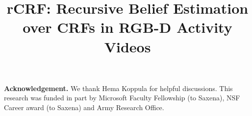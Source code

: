 \documentclass[conference]{IEEEtran}
\begin{document}
\title{rCRF: Recursive Belief Estimation over CRFs in RGB-D Activity Videos}

\author{
\and
{}
}



\maketitle



\IEEEpeerreviewmaketitle





%







\vspace{5mm}

\noindent\textbf{Acknowledgement.} We thank Hema Koppula for helpful discussions. This research was funded in part by Microsoft
Faculty Fellowship (to Saxena), NSF Career award (to
Saxena) and Army Research Office.

{
\small


}
\end{document}
